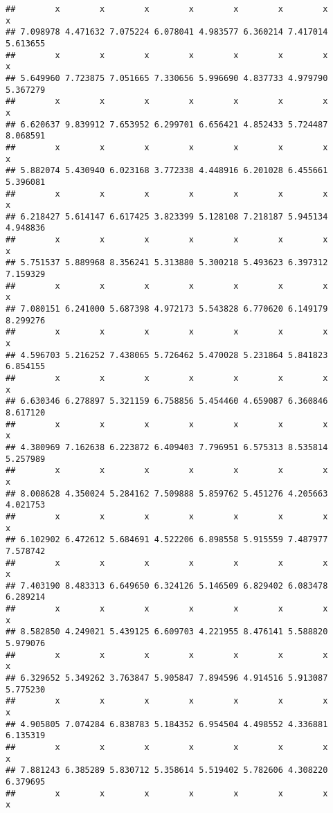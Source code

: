 \documentclass[a4paper,10pt]{book}\usepackage[]{graphicx}\usepackage[]{color}
\makeatletter
\newenvironment{kframe}{%
 \def\at@end@of@kframe{}%
 \ifinner\ifhmode%
  \def\at@end@of@kframe{\end{minipage}}%
  \begin{minipage}{\columnwidth}%
 \fi\fi%
 \def\FrameCommand##1{\hskip\@totalleftmargin \hskip-\fboxsep
 \colorbox{shadecolor}{##1}\hskip-\fboxsep
     \hskip-\linewidth \hskip-\@totalleftmargin \hskip\columnwidth}%
 \MakeFramed {\advance\hsize-\width
   \@totalleftmargin\z@ \linewidth\hsize
   \@setminipage}}%
 {\par\unskip\endMakeFramed%
 \at@end@of@kframe}
\newenvironment{knitrout}{}{} %
\makeatother
\begin{document}
\begin{knitrout}
\begin{kframe}
\begin{verbatim}
##        x        x        x        x        x        x        x        x 
## 7.098978 4.471632 7.075224 6.078041 4.983577 6.360214 7.417014 5.613655 
##        x        x        x        x        x        x        x        x 
## 5.649960 7.723875 7.051665 7.330656 5.996690 4.837733 4.979790 5.367279 
##        x        x        x        x        x        x        x        x 
## 6.620637 9.839912 7.653952 6.299701 6.656421 4.852433 5.724487 8.068591 
##        x        x        x        x        x        x        x        x 
## 5.882074 5.430940 6.023168 3.772338 4.448916 6.201028 6.455661 5.396081 
##        x        x        x        x        x        x        x        x 
## 6.218427 5.614147 6.617425 3.823399 5.128108 7.218187 5.945134 4.948836 
##        x        x        x        x        x        x        x        x 
## 5.751537 5.889968 8.356241 5.313880 5.300218 5.493623 6.397312 7.159329 
##        x        x        x        x        x        x        x        x 
## 7.080151 6.241000 5.687398 4.972173 5.543828 6.770620 6.149179 8.299276 
##        x        x        x        x        x        x        x        x 
## 4.596703 5.216252 7.438065 5.726462 5.470028 5.231864 5.841823 6.854155 
##        x        x        x        x        x        x        x        x 
## 6.630346 6.278897 5.321159 6.758856 5.454460 4.659087 6.360846 8.617120 
##        x        x        x        x        x        x        x        x 
## 4.380969 7.162638 6.223872 6.409403 7.796951 6.575313 8.535814 5.257989 
##        x        x        x        x        x        x        x        x 
## 8.008628 4.350024 5.284162 7.509888 5.859762 5.451276 4.205663 4.021753 
##        x        x        x        x        x        x        x        x 
## 6.102902 6.472612 5.684691 4.522206 6.898558 5.915559 7.487977 7.578742 
##        x        x        x        x        x        x        x        x 
## 7.403190 8.483313 6.649650 6.324126 5.146509 6.829402 6.083478 6.289214 
##        x        x        x        x        x        x        x        x 
## 8.582850 4.249021 5.439125 6.609703 4.221955 8.476141 5.588820 5.979076 
##        x        x        x        x        x        x        x        x 
## 6.329652 5.349262 3.763847 5.905847 7.894596 4.914516 5.913087 5.775230 
##        x        x        x        x        x        x        x        x 
## 4.905805 7.074284 6.838783 5.184352 6.954504 4.498552 4.336881 6.135319 
##        x        x        x        x        x        x        x        x 
## 7.881243 6.385289 5.830712 5.358614 5.519402 5.782606 4.308220 6.379695 
##        x        x        x        x        x        x        x        x 

\end{verbatim}
\end{kframe}
\end{knitrout}
\end{document}
